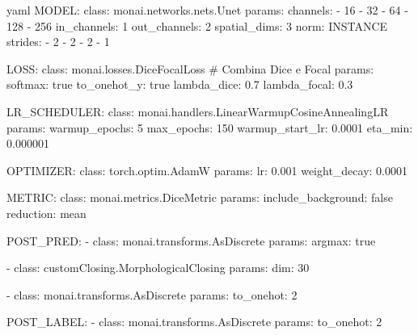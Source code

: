 \begin{code}{yaml}
MODEL:
  class: monai.networks.nets.Unet 
  params:
    channels:
      - 16
      - 32
      - 64
      - 128
      - 256
    in_channels: 1
    out_channels: 2
    spatial_dims: 3
    norm: INSTANCE
    strides:  
      - 2 
      - 2
      - 2
      - 1

LOSS:
  class: monai.losses.DiceFocalLoss  # Combina Dice e Focal
  params:
    softmax: true
    to_onehot_y: true
    lambda_dice: 0.7
    lambda_focal: 0.3

LR_SCHEDULER:
  class: monai.handlers.LinearWarmupCosineAnnealingLR
  params:
    warmup_epochs: 5
    max_epochs: 150
    warmup_start_lr: 0.0001
    eta_min: 0.000001

OPTIMIZER:
  class: torch.optim.AdamW
  params:
    lr: 0.001
    weight_decay: 0.0001  

METRIC:
  class: monai.metrics.DiceMetric
  params:
    include_background: false
    reduction: mean

POST_PRED:
  - class: monai.transforms.AsDiscrete
    params:
      argmax: true

  - class: customClosing.MorphologicalClosing
    params:
      dim: 30

  - class: monai.transforms.AsDiscrete
    params:
      to_onehot: 2

POST_LABEL:                                                                               
  - class: monai.transforms.AsDiscrete
    params:
      to_onehot: 2
\end{code}    